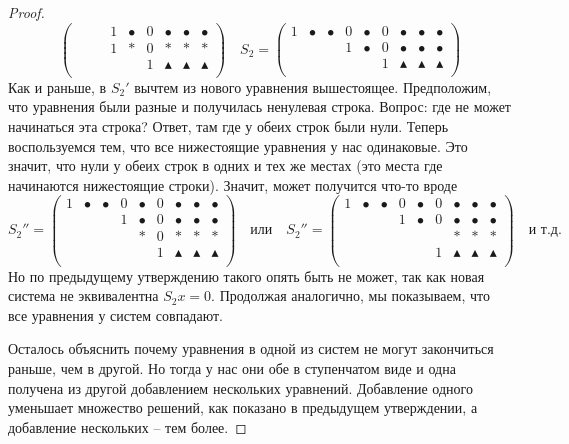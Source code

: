 \begin{proof}
\[\begin{pmatrix}
{}&{}&{}&{1}&{\bullet}&{0}&{\bullet}&{\bullet}&{\bullet}\\
{}&{}&{}&{1}&{*}&{0}&{*}&{*}&{*}\\
{}&{}&{}&{}&{}&{1}&{\blacktriangle}&{\blacktriangle}&{\blacktriangle}\\
\end{pmatrix}\quad
S_2 = 
\begin{pmatrix}
{1}&{\bullet}&{\bullet}&{0}&{\bullet}&{0}&{\bullet}&{\bullet}&{\bullet}\\
{}&{}&{}&{1}&{\bullet}&{0}&{\bullet}&{\bullet}&{\bullet}\\
{}&{}&{}&{}&{}&{1}&{\blacktriangle}&{\blacktriangle}&{\blacktriangle}\\
\end{pmatrix}
\]
Как и раньше, в $S_2'$ вычтем из нового уравнения вышестоящее.
Предположим, что уравнения были разные и получилась ненулевая строка.
Вопрос: где не может начинаться эта строка?
Ответ, там где у обеих строк были нули.
Теперь воспользуемся тем, что все нижестоящие уравнения у нас одинаковые.
Это значит, что нули у обеих строк в одних и тех же местах (это места где начинаются нижестоящие строки).
Значит, может получится что-то вроде
\[
S_2'' = 
\begin{pmatrix}
{1}&{\bullet}&{\bullet}&{0}&{\bullet}&{0}&{\bullet}&{\bullet}&{\bullet}\\
{}&{}&{}&{1}&{\bullet}&{0}&{\bullet}&{\bullet}&{\bullet}\\
{}&{}&{}&{}&{*}&{0}&{*}&{*}&{*}\\
{}&{}&{}&{}&{}&{1}&{\blacktriangle}&{\blacktriangle}&{\blacktriangle}\\
\end{pmatrix}\quad\text{или}\quad
S_2'' = 
\begin{pmatrix}
{1}&{\bullet}&{\bullet}&{0}&{\bullet}&{0}&{\bullet}&{\bullet}&{\bullet}\\
{}&{}&{}&{1}&{\bullet}&{0}&{\bullet}&{\bullet}&{\bullet}\\
{}&{}&{}&{}&{}&{}&{*}&{*}&{*}\\
{}&{}&{}&{}&{}&{1}&{\blacktriangle}&{\blacktriangle}&{\blacktriangle}\\
\end{pmatrix}\quad\text{и т.д.}
\]
Но по предыдущему утверждению такого опять быть не может, так как новая система не эквивалентна $S_2 x = 0$.
Продолжая аналогично, мы показываем, что все уравнения у систем совпадают.

Осталось объяснить почему уравнения в одной из систем не могут закончиться раньше, чем в другой.
Но тогда у нас они обе в ступенчатом виде и одна получена из другой добавлением нескольких уравнений.
Добавление одного уменьшает множество решений, как показано в предыдущем утверждении, а добавление нескольких -- тем более.
\end{proof}

